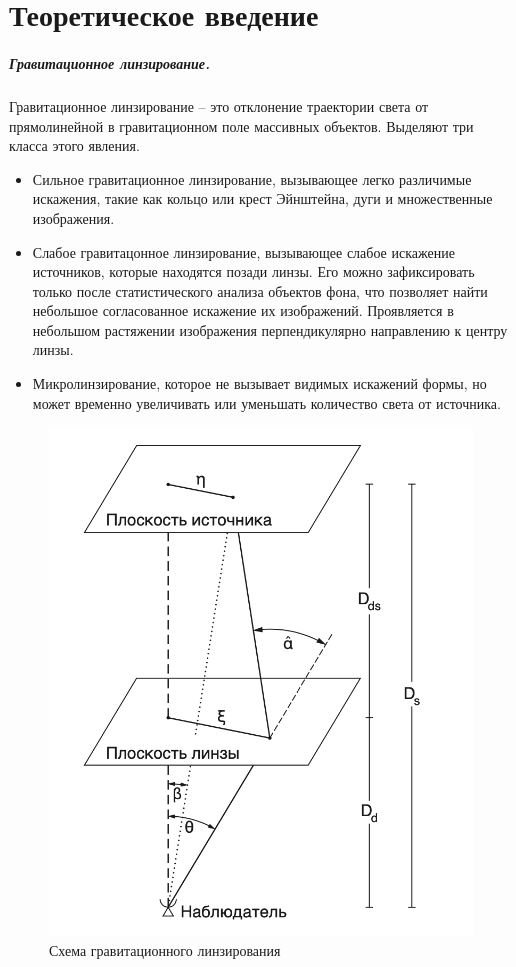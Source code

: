 \documentclass[12pt,a4paper]{article}
\begin{document}
\section*{Теоретическое введение}
\subparagraph*{Гравитационное линзирование.}
Гравитационное линзирование – это отклонение траектории света от прямолинейной в гравитационном поле массивных объектов. 
Выделяют три класса этого явления.
\begin{itemize}
    \item Сильное гравитационное линзирование, вызывающее легко различимые искажения, такие как кольцо или крест Эйнштейна, дуги и множественные изображения.
    \item Слабое гравитацонное линзирование, вызывающее слабое искажение источников, которые находятся позади линзы. 
    Его можно зафиксировать только после статистического анализа объектов фона, что позволяет найти небольшое согласованное искажение их изображений. 
    Проявляется в небольшом растяжении изображения перпендикулярно направлению к центру линзы.
    \item Микролинзирование, которое не вызывает видимых искажений формы, но может временно увеличивать или уменьшать количество света от источника.
\end{itemize}

\begin{figure}
    \centering
    \includegraphics[width=\linewidth]{sources/scheme.png}
    \caption{\small{Схема гравитационного линзирования}}
\end{figure}  
\end{document}
